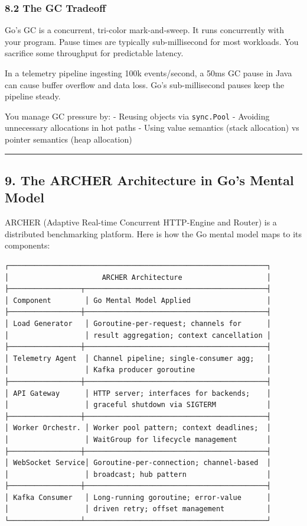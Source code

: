 \documentclass[11pt,openany]{book}
\begin{document}
\hypertarget{the-gc-tradeoff}{%
\subsubsection{8.2 The GC Tradeoff}\label{the-gc-tradeoff}}

Go's GC is a concurrent, tri-color mark-and-sweep. It runs concurrently
with your program. Pause times are typically sub-millisecond for most
workloads. You sacrifice some throughput for predictable latency.

In a telemetry pipeline ingesting 100k events/second, a 50ms GC pause in
Java can cause buffer overflow and data loss. Go's sub-millisecond
pauses keep the pipeline steady.

You manage GC pressure by: - Reusing objects via \texttt{sync.Pool} -
Avoiding unnecessary allocations in hot paths - Using value semantics
(stack allocation) vs pointer semantics (heap allocation)

\begin{center}\rule{0.5\linewidth}{0.5pt}\end{center}

\hypertarget{the-archer-architecture-in-gos-mental-model}{%
\subsection{9. The ARCHER Architecture in Go's Mental
Model}\label{the-archer-architecture-in-gos-mental-model}}

ARCHER (Adaptive Real-time Concurrent HTTP-Engine and Router) is a
distributed benchmarking platform. Here is how the Go mental model maps
to its components:

\begin{verbatim}
┌─────────────────────────────────────────────────────────────┐
│                      ARCHER Architecture                    │
├─────────────────┬───────────────────────────────────────────┤
│ Component        │ Go Mental Model Applied                  │
├─────────────────┼───────────────────────────────────────────┤
│ Load Generator   │ Goroutine-per-request; channels for      │
│                  │ result aggregation; context cancellation │
├─────────────────┼───────────────────────────────────────────┤
│ Telemetry Agent  │ Channel pipeline; single-consumer agg;   │
│                  │ Kafka producer goroutine                 │
├─────────────────┼───────────────────────────────────────────┤
│ API Gateway      │ HTTP server; interfaces for backends;    │
│                  │ graceful shutdown via SIGTERM            │
├─────────────────┼───────────────────────────────────────────┤
│ Worker Orchestr. │ Worker pool pattern; context deadlines;  │
│                  │ WaitGroup for lifecycle management       │
├─────────────────┼───────────────────────────────────────────┤
│ WebSocket Service│ Goroutine-per-connection; channel-based  │
│                  │ broadcast; hub pattern                   │
├─────────────────┼───────────────────────────────────────────┤
│ Kafka Consumer   │ Long-running goroutine; error-value      │
│                  │ driven retry; offset management          │
└─────────────────┴───────────────────────────────────────────┘
\end{verbatim}
\end{document}

